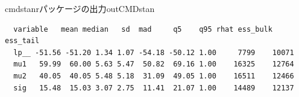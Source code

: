 \begin{SCcmd}{cmdstanrパッケージの出力}{outCMDstan}
	\begin{verbatim}
  variable   mean median   sd  mad     q5    q95 rhat ess_bulk ess_tail
  lp__ -51.56 -51.20 1.34 1.07 -54.18 -50.12 1.00     7799    10071
  mu1   59.99  60.00 5.63 5.47  50.82  69.16 1.00    16325    12764
  mu2   40.05  40.05 5.48 5.18  31.09  49.05 1.00    16511    12466
  sig   15.48  15.03 3.07 2.75  11.41  21.07 1.00    14489    12137
\end{verbatim}
\end{SCcmd}
